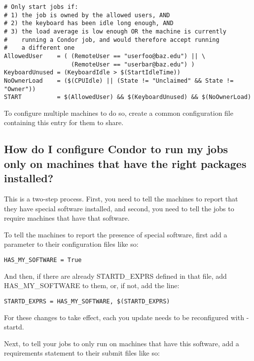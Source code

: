 \footnotesize
\begin{verbatim}
# Only start jobs if:
# 1) the job is owned by the allowed users, AND
# 2) the keyboard has been idle long enough, AND
# 3) the load average is low enough OR the machine is currently
#    running a Condor job, and would therefore accept running
#    a different one
AllowedUser    = ( (RemoteUser == "userfoo@baz.edu") || \
                   (RemoteUser == "userbar@baz.edu") )
KeyboardUnused = (KeyboardIdle > $(StartIdleTime))
NoOwnerLoad    = ($(CPUIdle) || (State != "Unclaimed" && State != "Owner"))
START          = $(AllowedUser) && $(KeyboardUnused) && $(NoOwnerLoad)
\end{verbatim}
\normalsize

To configure multiple machines to do so, create a common
configuration file containing this entry for them to share.

\subsection*{How do I configure Condor to run my jobs only on machines that have the right packages installed?}

This is a two-step process.
First, you need to tell the machines to report that they have special
software installed, and second, you need to tell the jobs to require
machines that have that software.

To tell the machines to report the presence of special software, first
add a parameter to their configuration files like so:

\begin{verbatim}
HAS_MY_SOFTWARE = True
\end{verbatim}

And then, if there are already STARTD\_EXPRS defined in that file, add
HAS\_MY\_SOFTWARE to them, or, if not, add the line:

\footnotesize
\begin{verbatim}
STARTD_EXPRS = HAS_MY_SOFTWARE, $(STARTD_EXPRS)
\end{verbatim}
\normalsize

\Note For these changes to take effect, each  you update
needs to be reconfigured with \Condor{reconfig} -startd.

Next, to tell your jobs to only run on machines that have this
software, add a requirements statement to their submit files like so:

